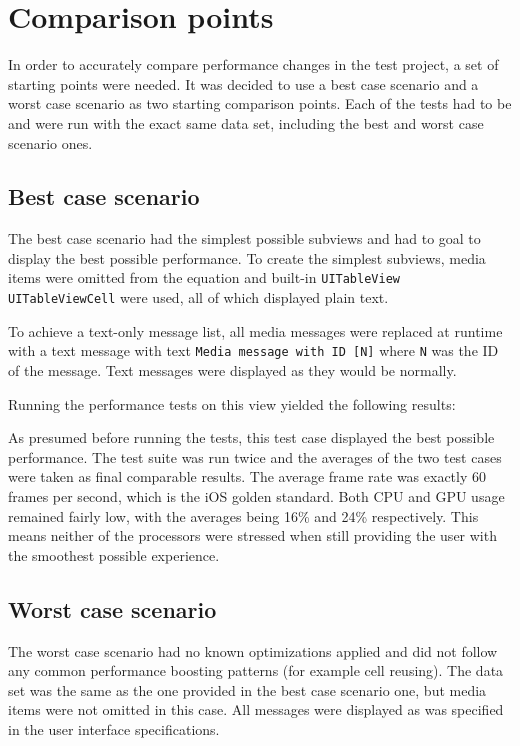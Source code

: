 \documentclass[a4paper,12pt]{article}
\begin{document}
\newpage
\section{Comparison points}
In order to accurately compare performance changes in the test project, a set of starting points were needed. It was decided to use a best case scenario and a worst case scenario as two starting comparison points. Each of the tests had to be and were run with the exact same data set, including the best and worst case scenario ones.

\subsection{Best case scenario}
The best case scenario had the simplest possible subviews and had to goal to display the best possible performance. To create the simplest subviews, media items were omitted from the equation and built-in \texttt{UITableView} \texttt{UITableViewCell} were used, all of which displayed plain text.

To achieve a text-only message list, all media messages were replaced at runtime with a text message with text \texttt{Media message with ID [N]} where \texttt{N} was the ID of the message. Text messages were displayed as they would be normally.

Running the performance tests on this view yielded the following results:

As presumed before running the tests, this test case displayed the best possible performance. The test suite was run twice and the averages of the two test cases were taken as final comparable results. The average frame rate was exactly 60 frames per second, which is the iOS golden standard\cite{IntroducingAsyncDisplayKit}. Both CPU and GPU usage remained fairly low, with the averages being 16\% and 24\% respectively. This means neither of the processors were stressed when still providing the user with the smoothest possible experience.

\subsection{Worst case scenario}
The worst case scenario had no known optimizations applied and did not follow any common performance boosting patterns (for example cell reusing). The data set was the same as the one provided in the best case scenario one, but media items were not omitted in this case. All messages were displayed as was specified in the user interface specifications.
\end{document}
